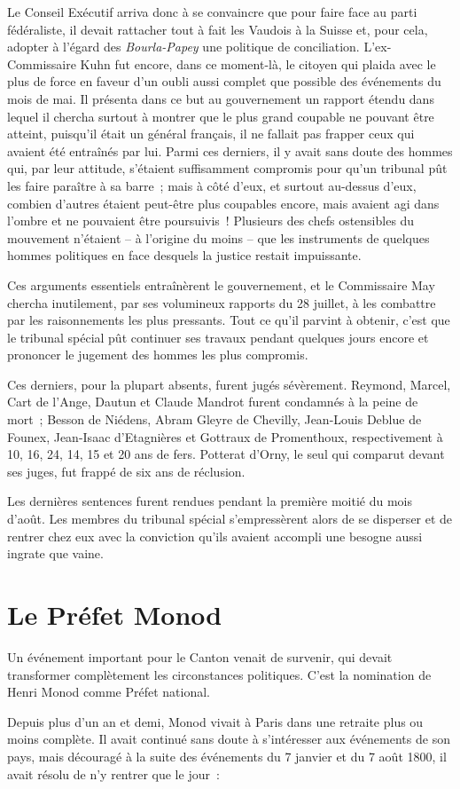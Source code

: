 \documentclass[french,twoside]{book} %
\begin{document}
Le Conseil Exécutif arriva donc à se convaincre que pour faire face au parti fédéraliste, il devait rattacher tout à fait les Vaudois à la Suisse et, pour cela, adopter à l’égard des \emph{Bourla-Papey} une politique de conciliation. L’ex-Commissaire Kuhn fut encore, dans ce moment-là, le citoyen qui plaida avec le plus de force en faveur d’un oubli aussi complet que possible des événements du mois de mai. Il présenta dans ce but au gouvernement un rapport étendu dans lequel il chercha surtout à montrer que le plus grand coupable ne pouvant être atteint, puisqu’il était un général français, il ne fallait pas frapper ceux qui avaient été entraînés par lui. Parmi ces derniers, il y avait sans doute des hommes qui, par leur attitude, s’étaient suffisamment compromis pour qu’un tribunal pût les faire paraître à sa barre ; mais à côté d’eux, et surtout au-dessus d’eux, combien d’autres étaient peut-être plus coupables encore, mais avaient agi dans l’ombre et ne pouvaient être poursuivis ! Plusieurs des chefs ostensibles du mouvement n’étaient – à l’origine du moins – que les instruments de quelques hommes politiques en face desquels la justice restait impuissante.\par
Ces arguments essentiels entraînèrent le gouvernement, et le Commissaire May chercha inutilement, par ses volumineux rapports du 28 juillet, à les combattre par les raisonnements les plus pressants. Tout ce qu’il parvint à obtenir, c’est que le tribunal spécial pût continuer ses travaux pendant quelques jours encore et prononcer le jugement des hommes les plus compromis.\par
Ces derniers, pour la plupart absents, furent jugés sévèrement. Reymond, Marcel, Cart de l’Ange, Dautun et Claude Mandrot furent condamnés à la peine de mort ; Besson de Niédens, Abram Gleyre de Chevilly, Jean-Louis Deblue de Founex, Jean-Isaac d’Etagnières et Gottraux de Promenthoux, respectivement à 10, 16, 24, 14, 15 et 20 ans de fers. Potterat d’Orny, le seul qui comparut devant ses juges, fut frappé de six ans de réclusion.\par
Les dernières sentences furent rendues pendant la première moitié du mois d’août. Les membres du tribunal spécial s’empressèrent alors de se disperser et de rentrer chez eux avec la conviction qu’ils avaient accompli une besogne aussi ingrate que vaine.
\section[Le Préfet Monod]{Le Préfet Monod}
\noindent Un événement important pour le Canton venait de survenir, qui devait transformer complètement les circonstances politiques. C’est la nomination de Henri Monod comme Préfet national.\par
Depuis plus d’un an et demi, Monod vivait à Paris dans une retraite plus ou moins complète. Il avait continué sans doute à s’intéresser aux événements de son pays, mais découragé à la suite des événements du 7 janvier et du 7 août 1800, il avait résolu de n’y rentrer que le jour :\par
\end{document}

